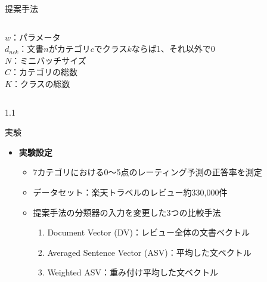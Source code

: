 \documentclass[unicode,10pt]{beamer}
\newlength{\mycolumnwidth}
\newcommand{\itemtitle}[1]{\textbf{#1}\\}
\begin{document}
\begin{frame}[t]
\begin{block}{提案手法}
\begin{columns}[onlytextwidth,t]
\begin{column}{\mycolumnwidth}
\begin{itemize}
{            %
            $w$：パラメータ \\
            $d_{nck}$：文書$n$がカテゴリ$c$でクラス$k$ならば1、それ以外で0 \\
            $N$：ミニバッチサイズ \\
            $C$：カテゴリの総数 \\
            $K$：クラスの総数 \\
          }
      \end{itemize}
    \end{column}
  \end{columns}
\end{block}

\begin{columns}[onlytextwidth,t]
  \begin{column}{1.1\mycolumnwidth}
    \begin{block}{実験}
      \begin{itemize}
        \item \itemtitle{実験設定}
          \begin{itemize}
            \item 7カテゴリにおける0〜5点のレーティング予測の正答率を測定
            \item データセット：楽天トラベルのレビュー約330,000件
            \item 提案手法の分類器の入力を変更した3つの比較手法
              \begin{enumerate}
                \item Document Vector (DV)：レビュー全体の文書ベクトル
                \item Averaged Sentence Vector (ASV)：平均した文ベクトル
                \item Weighted ASV：重み付け平均した文ベクトル
              \end{enumerate}
          \end{itemize}
      \end{itemize}


\end{block}
\end{column}
\end{columns}
\end{frame}
\end{document}
